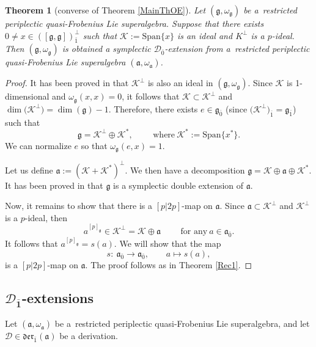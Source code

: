 \documentclass[10pt,a4paper]{amsart}
\numberwithin{equation}{section}
\newtheorem{Theorem}{Theorem}[section]
\begin{document}
\begin{Theorem}[converse of Theorem \ref{MainThOE}]
\label{Rec3}
Let $(\mathfrak{g},\omega_\mathfrak{g})$ be a~restricted periplectic quasi-Frobenius Lie superalgebra. Suppose that there exists $0\not = x \in ([\mathfrak{g}, \mathfrak{g}])^\perp_{\bar 1}$ such that $\mathscr{K}:=\mathrm{Span}\{x\}$ is an ideal and $K^\perp$ is a $p$-ideal. Then $(\mathfrak{g},\omega_\mathfrak{g})$ is obtained a symplectic ${\mathscr D}_{\bar 0}$-extension from a~restricted periplectic quasi-Frobenius Lie superalgebra $(\mathfrak{a},\omega_\mathfrak{a})$.%
\end{Theorem}
\begin{proof}
It has been proved in \cite{BM} that $\mathscr{K}^\perp$ is also an ideal in $(\mathfrak{g},\omega_\mathfrak{g})$. Since $\mathscr{K}$ is 1-dimensional and $\omega_\mathfrak{g}(x,x)=0$, it follows that $\mathscr{K}\subset \mathscr{K}^\perp$ and $\dim\bigl(\mathscr{K}^\perp\bigr)=\dim(\mathfrak{g})-1$. Therefore, there exists $e \in \mathfrak{g}_{\bar 0}$ \big(since $\bigl(\mathscr{K}^\perp\bigr)_{\bar 1}=\mathfrak{g}_{\bar 1}$\big) such that
\[
\mathfrak{g}=\mathscr{K}^\perp\oplus \mathscr{K}^*, \qquad \text{ where} \ \mathscr{K}^*:=\mathrm{Span}\{x^*\}.
\]
We can normalize $e$ so that $\omega_\mathfrak{g}(e,x)=1$.

Let us define $\mathfrak{a}:=(\mathscr{K} +\mathscr{K}^*)^\perp$. We then have a decomposition $\mathfrak{g}=\mathscr{K} \oplus \mathfrak{a} \oplus \mathscr{K}^*$. It has been proved in \cite{BM} that $\mathfrak{g}$ is a symplectic double extension of $\mathfrak{a}$.


Now, it remains to show that there is a $[p|2p]$-map on $\mathfrak{a}$. Since $\mathfrak{a} \subset \mathscr{K}^\perp$ and $\mathscr{K}^\perp$ is a $p$-ideal, then
\[
a^{[p]_\mathfrak{g}}\in \mathscr{K}^\perp=\mathscr{K} \oplus \mathfrak{a} \qquad \text{ for any}\ a \in \mathfrak{a}_{\bar 0}.
\]
It follows that $ a^{[p]_\mathfrak{g}}=s(a).$ We will show that the map
\[
s\colon\ \mathfrak{a}_{\bar 0} \rightarrow \mathfrak{a}_{\bar 0}, \qquad a\mapsto s(a),
\]
is a $[p|2p]$-map on $\mathfrak{a}$. The proof follows as in Theorem \ref{Rec1}.
\end{proof}
\subsection[D\_1-extensions]{$\boldsymbol{{\mathscr D}_{\bar 1}}$-extensions}
Let $(\mathfrak{a}, \omega_\mathfrak{a})$ be a~restricted periplectic quasi-Frobenius Lie superalgebra, and let ${\mathscr D}\in \mathfrak{der}_{\bar 1}(\mathfrak{a})$ be a derivation.
\end{document}
